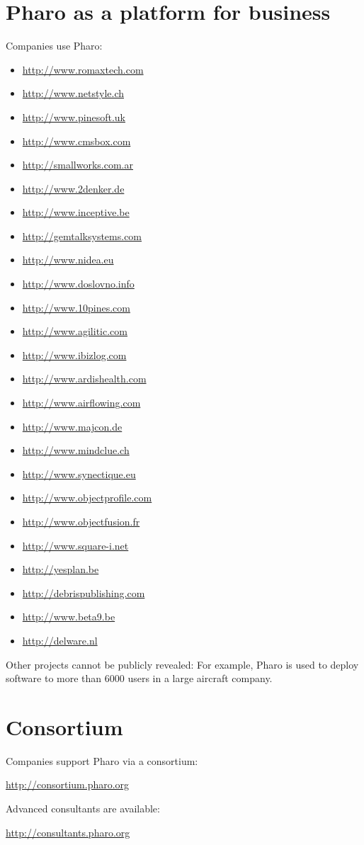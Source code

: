 \documentclass[notumble]{leaflet}
\begin{document}
\pagebreak{}

\section{Pharo as a platform for business}

Companies use Pharo:

\begin{itemize}
\item \url{http://www.romaxtech.com}
\item \url{http://www.netstyle.ch}
\item \url{http://www.pinesoft.uk}
\item \url{http://www.cmsbox.com}
\item \url{http://smallworks.com.ar}
\item \url{http://www.2denker.de}
\item \url{http://www.inceptive.be}
\item \url{http://gemtalksystems.com}
\item \url{http://www.nidea.eu}
\item \url{http://www.doslovno.info}
\item \url{http://www.10pines.com}
\item \url{http://www.agilitic.com}
\item \url{http://www.ibizlog.com}
\item \url{http://www.ardishealth.com}
\item \url{http://www.airflowing.com}
\item \url{http://www.majcon.de}
\item \url{http://www.mindclue.ch}
\item \url{http://www.synectique.eu}
\item \url{http://www.objectprofile.com}
\item \url{http://www.objectfusion.fr}
\item \url{http://www.square-i.net}
\item \url{http://yesplan.be}
\item \url{http://debrispublishing.com}
\item \url{http://www.beta9.be}
\item \url{http://delware.nl}
\end{itemize}

Other projects cannot be publicly revealed: For example, Pharo is used to deploy software to more than 6000 users in a large aircraft company.

\section{Consortium}

Companies support Pharo via a consortium:
\begin{center}
  \url{http://consortium.pharo.org}
\end{center}


Advanced consultants are available:
\begin{center}
  \url{http://consultants.pharo.org}
\end{center}
\end{document}
